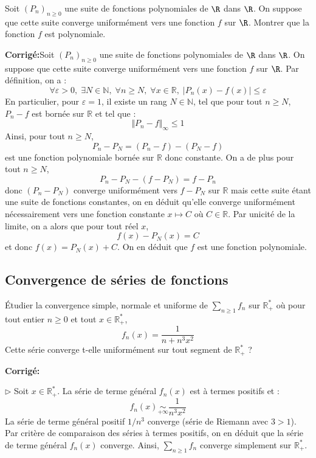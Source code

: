 \documentclass[a4paper,twoside,french,11pt]{VcCours}
\newcommand{\Sum}[2]{\sum_{#1}^{#2}}
\newcommand{\corr}{\textbf{Corrigé:}}
\begin{document}
\medskip


\begin{Exercice}{} Soit $(P_{n})_{n \geq 0}$ une suite de fonctions polynomiales de $\R$ dans $\R$. On suppose que cette suite converge uniformément vers une fonction $f$ sur $\R$. Montrer que la fonction $f$ est polynomiale.
\end{Exercice}

\corr Soit $(P_{n})_{n \geq 0}$ une suite de fonctions polynomiales de $\R$ dans $\R$. On suppose que cette suite converge uniformément vers une fonction $f$ sur $\R$. Par définition, on a :
$$ \forall \varepsilon >0, \; \exists N \in \mathbb{N}, \; \forall n \geq N, \;  \forall x \in \mathbb{R}, \; \vert P_n(x)-f(x) \vert \leq \varepsilon$$
En particulier, pour $\varepsilon=1$, il existe un rang $N \in \mathbb{N}$, tel que pour tout $n \geq N$, $P_n-f$ est bornée sur $\mathbb{R}$ et tel que :
$$ \Vert P_n- f \Vert_{\infty} \leq 1$$
Ainsi, pour tout $n \geq N$,
$$ P_n-P_N = (P_n-f)-(P_N-f)$$
est une fonction polynomiale bornée sur $\mathbb{R}$ donc constante. On a de plus pour tout $n \geq N$,
$$ P_n-P_N - (f-P_N) = f-P_n$$
donc $(P_n-P_N)$ converge uniformément vers $f-P_N$ sur $\mathbb{R}$ mais cette suite étant une suite de fonctions constantes, on en déduit qu'elle converge uniformément nécessairement vers une fonction constante $x \mapsto C$ où $C \in \mathbb{R}$. Par unicité de la limite, on a alors que pour tout réel $x$,
$$ f(x)-P_N(x)=C$$
et donc $f(x)=P_N(x)+C$. On en déduit que $f$ est une fonction polynomiale.



\subsection{Convergence de séries de fonctions}


\begin{Exercice}{} Étudier la convergence simple, normale et uniforme de $\Sum{n\geq 1}{} f_n$ sur $\mathbb{R}_+^*$ où pour tout entier $n \geq 0$ et tout $x \in \mathbb{R}_+^*$, 
$$ f_n(x) = \frac{1}{n+n^3x^2}$$
Cette série converge t-elle uniformément sur tout segment de $\mathbb{R}_+^*$ ?
\end{Exercice} 

\corr 

$\rhd$ Soit $x \in \mathbb{R}_+^*$. La série de terme général $f_n(x)$ est à termes positifs et :
$$ f_n(x) \underset{+ \infty}{\sim} \dfrac{1}{n^3x^2}$$
La série de terme général positif $1/n^3$ converge (série de Riemann avec $3>1$). Par critère de comparaison des séries à termes positifs, on en déduit que la série de terme général $f_n(x)$ converge. Ainsi, $\Sum{n\geq 1}{} f_n$ converge simplement sur $\mathbb{R}_+^*$.
\end{document}
